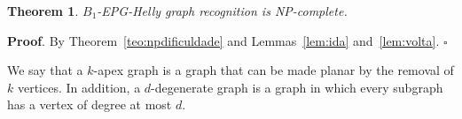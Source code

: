 \documentclass[9pt]{entcs}
\newtheorem{teo}{Theorem}[section]
\newtheorem{prove}{Proof}[section]
\begin{document}









\begin{teo}
{\sc $B_{1}$-EPG-Helly graph recognition} is NP-complete.
\end{teo}
\begin{prove*} \textbf{Proof}.
By Theorem~\ref{teo:npdificuldade} and Lemmas~\ref{lem:ida} and~\ref{lem:volta}.
$\square$ \end{prove*}

We say that a $k$-apex graph is a graph that can be made planar by the removal of $k$ vertices. In addition, a $d$-degenerate graph is a graph in which every subgraph has a vertex of degree at most $d$.
\end{document}
